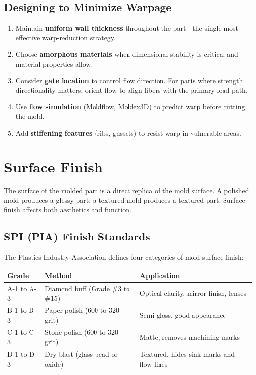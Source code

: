 \documentclass[11pt,letterpaper,twoside,openany]{book}
\begin{document}
\subsection{Designing to Minimize Warpage}
\begin{enumerate}[leftmargin=1.5em]
\item Maintain \textbf{uniform wall thickness} throughout the part---the single most effective warp-reduction strategy.
\item Choose \textbf{amorphous materials} when dimensional stability is critical and material properties allow.
\item Consider \textbf{gate location} to control flow direction. For parts where strength directionality matters, orient flow to align fibers with the primary load path.
\item Use \textbf{flow simulation} (Moldflow, Moldex3D) to predict warp before cutting the mold.
\item Add \textbf{stiffening features} (ribs, gussets) to resist warp in vulnerable areas.
\end{enumerate}

\FloatBarrier
\section{Surface Finish}
\label{sec:surface}

The surface of the molded part is a direct replica of the mold surface. A polished mold produces a glossy part; a textured mold produces a textured part. Surface finish affects both aesthetics and function.

\subsection{SPI (PIA) Finish Standards}
The Plastics Industry Association defines four categories of mold surface finish:

\begin{center}
\small
\begin{tabularx}{\textwidth}{l l X}
\toprule
\textbf{Grade} & \textbf{Method} & \textbf{Application} \\
\midrule
A-1 to A-3 & Diamond buff (Grade \#3 to \#15) & Optical clarity, mirror finish, lenses \\
B-1 to B-3 & Paper polish (600 to 320 grit) & Semi-gloss, good appearance \\
C-1 to C-3 & Stone polish (600 to 320 grit) & Matte, removes machining marks \\
D-1 to D-3 & Dry blast (glass bead or oxide) & Textured, hides sink marks and flow lines \\
\bottomrule
\end{tabularx}
\end{center}
\end{document}
